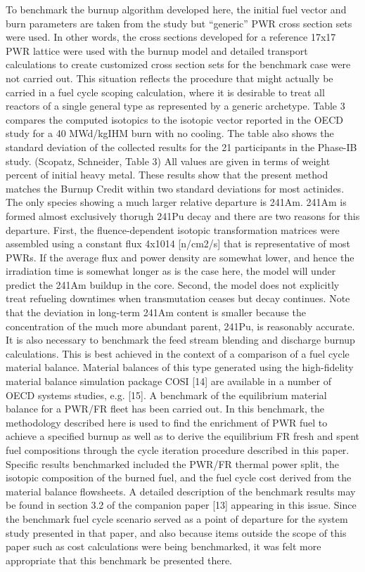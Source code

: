 To benchmark the burnup algorithm developed here, the initial fuel vector and burn parameters are taken from the study but “generic” PWR cross section sets were used.  In other words, the cross sections developed for a reference 17x17 PWR lattice were used with the burnup model and detailed transport calculations to create customized cross section sets for the benchmark case were not carried out.  This situation reflects the procedure that might actually be carried in a fuel cycle scoping calculation, where it is desirable to treat all reactors of a single general type as represented by a generic archetype.  Table 3 compares the computed isotopics to the isotopic vector reported in the OECD study for a 40 MWd/kgIHM burn with no cooling.  The table also shows the standard deviation of the collected results for the 21 participants in the Phase-IB study.  
(Scopatz, Schneider, Table 3)
All values are given in terms of weight percent of initial heavy metal.    These results show that the present method matches the Burnup Credit within two standard deviations for most actinides.  The only species showing a much larger relative departure is 241Am.  241Am is formed almost exclusively thorugh 241Pu decay and there are two reasons for this departure.  First, the fluence-dependent isotopic transformation matrices were assembled using a constant flux 4x1014 [n/cm2/s] that is representative of most PWRs.  If the average flux and power density are somewhat lower, and hence the irradiation time is somewhat longer as is the case here, the model will under predict the 241Am buildup in the core.   Second, the model does not explicitly treat refueling downtimes when transmutation ceases but decay continues. Note that the deviation in long-term 241Am content is smaller because the concentration of the much more abundant parent, 241Pu, is reasonably accurate. 
It is also necessary to benchmark the feed stream blending and discharge burnup calculations.  This is best achieved in the context of a comparison of a fuel cycle material balance.  Material balances of this type generated using the high-fidelity material balance simulation package COSI [14] are available in a number of OECD systems studies, e.g. [15].  A benchmark of the equilibrium material balance for a PWR/FR fleet has been carried out.  In this benchmark, the methodology described here is used to find the enrichment of PWR fuel to achieve a specified burnup as well as to derive the equilibrium FR fresh and spent fuel compositions through the cycle iteration procedure described in this paper.  Specific results benchmarked included the PWR/FR thermal power split, the isotopic composition of the burned fuel, and the fuel cycle cost derived from the material balance flowsheets.  A detailed description of the benchmark results may be found in section 3.2 of the companion paper [13] appearing in this issue.  Since the benchmark fuel cycle scenario served as a point of departure for the system study presented in that paper, and also because items outside the scope of this paper such as cost calculations were being benchmarked, it was felt more appropriate that this benchmark be presented there.



